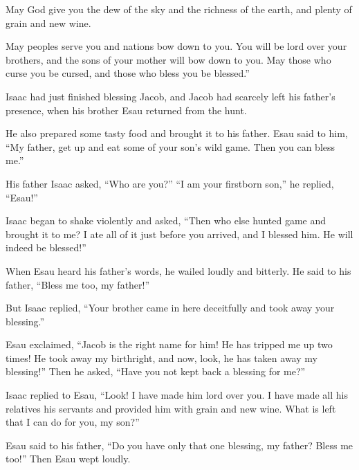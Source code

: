 \begin{scripture}
 May God give you the dew of the sky and the richness of the earth, and plenty of grain and new wine.
\everypar{}

 May peoples serve you and nations bow down to you. You will be lord over your brothers, and the sons of your mother will bow down to you. May those who curse you be cursed, and those who bless you be blessed.''
\everypar{}

 Isaac had just finished blessing Jacob, and Jacob had scarcely left his father's presence, when his brother Esau returned from the hunt.
 He also prepared some tasty food and brought it to his father. Esau said to him, ``My father, get up and eat some of your son's wild game. Then you can bless me.''
 His father Isaac asked, ``Who are you?'' ``I am your firstborn son,'' he replied, ``Esau!''
 Isaac began to shake violently and asked, ``Then who else hunted game and brought it to me? I ate all of it just before you arrived, and I blessed him. He will indeed be blessed!''
\everypar{}

 When Esau heard his father's words, he wailed loudly and bitterly. He said to his father, ``Bless me too, my father!''
 But Isaac replied, ``Your brother came in here deceitfully and took away your blessing.''
 Esau exclaimed, ``Jacob is the right name for him! He has tripped me up two times! He took away my birthright, and now, look, he has taken away my blessing!'' Then he asked, ``Have you not kept back a blessing for me?''
\everypar{}

 Isaac replied to Esau, ``Look! I have made him lord over you. I have made all his relatives his servants and provided him with grain and new wine. What is left that I can do for you, my son?''
 Esau said to his father, ``Do you have only that one blessing, my father? Bless me too!'' Then Esau wept loudly.
\everypar{}


\end{scripture}

